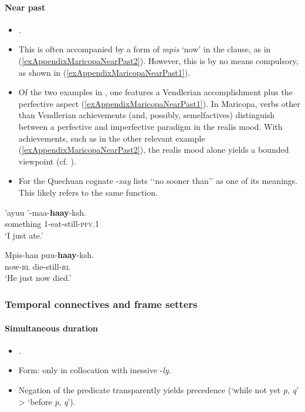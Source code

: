\paragraph{Near past}
\label{appendixMaricopaNearPast}
\begin{itemize}
	\item \textcite[142–143]{Gordon1986}.
	\item This is often accompanied by a form of \textit{mpis} \lq now' in the clause, as in (\ref{exAppendixMaricopaNearPast2}). However, this is by no means compulsory, as shown in (\ref{exAppendixMaricopaNearPast1}).
	\item Of the two examples in \textcite{Gordon1986}, one features a Vendlerian accomplishment plus the perfective aspect (\ref{exAppendixMaricopaNearPast1}). In Maricopa, verbs other than Vendlerian achievements (and, possibly, semelfactives) distinguish between a perfective and imperfective paradigm in the realis mood. With achievements, such as in the other relevant example (\ref{exAppendixMaricopaNearPast2}), the realis mood alone yields a bounded viewpoint (cf. \cite[102–103]{Gordon1986}).
	\item For the Quechuan cognate \mbox{-\textit{xay}} \textcite[284]{Halpern1946} lists \lq\lq no sooner than\rq\rq{ }as one of its meanings. This likely refers to the same function.
\end{itemize}
\begin{exe}
	\ex\label{exAppendixMaricopaNearPast1}
	\gll 'ayuu '-maa-\textbf{haay}-ksh.\\
	something 1-eat-still-\textsc{pfv}.1\\
	\glt \lq I just ate.' \parencite[143]{Gordon1986}

	\ex\label{exAppendixMaricopaNearPast2}
	\gll Mpis-han puu-\textbf{haay}-ksh.\\
	now-\textsc{rl} die-still-\textsc{rl}\\
	\glt \lq He just now died.' \parencite[143]{Gordon1986}
\end{exe}

\subsubsection{Temporal connectives and frame setters}
\paragraph{Simultaneous duration}\label{appendixMaricopaWhile}
\begin{itemize}
	\item \textcite[131–132, 270–271]{Gordon1986}.
	\item Form: only in collocation with inessive \mbox{-\textit{ly}}.
	\item Negation of the predicate transparently yields precedence (\lq while not yet \textit{p}, \textit{q}\rq{} > \lq before \textit{p}, \textit{q}\rq{}).
\end{itemize}


